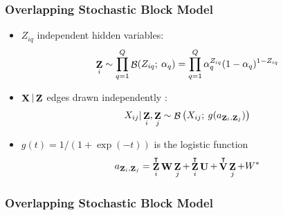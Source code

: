 \documentclass{beamer}
\DeclareMathOperator{\bZ}{{\bf Z}}
\DeclareMathOperator{\bX}{{\bf X}}
\DeclareMathOperator{\bW}{{\bf W}}
\DeclareMathOperator{\bU}{{\bf U}}
\DeclareMathOperator{\bV}{{\bf V}}
\DeclareMathOperator{\Bernoulli}{\mathcal{B}}
\begin{document}
\begin{frame}
\frametitle{Overlapping Stochastic Block Model}



\begin{itemize}
\item $Z_{iq}$ independent hidden variables:
     \begin{equation*} 
        \bZ_{i} \sim \prod_{q=1}^{Q} \Bernoulli (Z_{iq};\: \alpha_{q})
        = \prod_{q=1}^{Q} \alpha_{q}^{Z_{iq}} (1 - \alpha_{q})^{1 - Z_{iq}}
     \end{equation*}
 \item $\bX|\bZ$ edges drawn independently : 
      \begin{equation*}
        X_{ij}| \bZ_{i}, \bZ_{j} \sim \Bernoulli \big( X_{ij};\:
        g(a_{\bZ_{i}, \bZ_{j}})\big) 
      \end{equation*}
\item $g(t) = 1/\left(1+\exp(-t)\right)$ is the logistic function
      \begin{equation*}
        a_{\bZ_{i}, \bZ_{j}} = \bZ_{i}^{\intercal} \bW \bZ_{j} +
        \bZ_{i}^{\intercal}\bU + \bV^{\intercal}\bZ_{j} + W^{*}
      \end{equation*}
  \end{itemize}

\end{frame}


\begin{frame}
\frametitle{Overlapping Stochastic Block Model}

 \begin{figure}
     \\
  \end{figure}

\end{frame}
\end{document}

